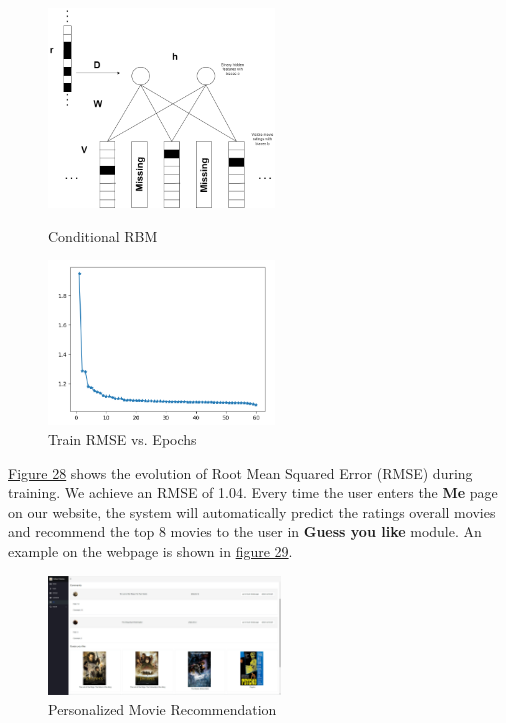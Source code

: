 \begin{CJK*}{UTF8}{gbsn}
\begin{figure}[htbp]
\centering
\label{RBM}
\begin{minipage}[t]{0.45\textwidth}
\centering
\includegraphics[width=6cm]{conditionalRBM.png}
\caption{Conditional RBM}
\label{rbm}
\end{minipage}
\begin{minipage}[t]{0.45\textwidth}
\centering
\includegraphics[width=6cm]{RBMResult.png}
\caption{Train RMSE vs. Epochs}
\end{minipage}
\end{figure}

\hyperref[RBM]{Figure 28} shows the evolution of Root Mean Squared Error (RMSE) during training. We achieve an RMSE of 1.04. Every time the user enters the \textbf{Me} page on our website, the system will automatically predict the ratings overall movies and recommend the top 8 movies to the user in \textbf{Guess you like} module. An example on the webpage is shown in \hyperref[recommend]{figure 29}.

\begin{figure}[h]
    \centering
    \label{recommend}
    \includegraphics[width = 0.55\textwidth]{recommendation.png}
    \caption{Personalized Movie Recommendation}
\end{figure}


\end{CJK*}
